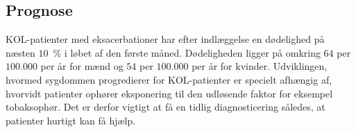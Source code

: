\subsection{Prognose}
KOL-patienter med eksacerbationer har efter indlæggelse en dødelighed på næsten $10$~$\%$ i løbet af den første måned. Dødeligheden ligger på omkring $64$ per $100.000$ per år for mænd og $54$ per $100.000$ per år for kvinder.
Udviklingen, hvormed sygdommen progredierer for KOL-patienter er specielt afhængig af, hvorvidt patienter ophører eksponering til den udløsende faktor for eksempel tobaksophør. Det er derfor vigtigt at få en tidlig diagnosticering således, at patienter hurtigt kan få hjælp.\cite{dsam2016}

